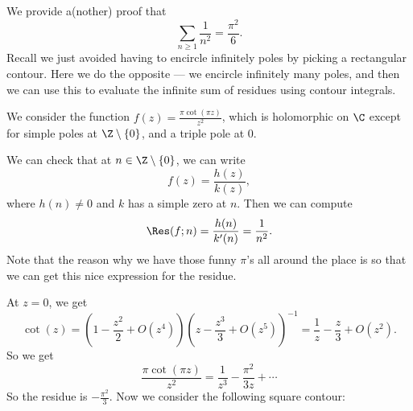 \documentclass[a4paper]{article}
\begin{document}
\begin{eg}
  We provide a(nother) proof that
  \[
    \sum_{n \geq 1} \frac{1}{n^2} = \frac{\pi^2}{6}.
  \]
  Recall we just avoided having to encircle infinitely poles by picking a rectangular contour. Here we do the opposite --- we encircle infinitely many poles, and then we can use this to evaluate the infinite sum of residues using contour integrals.

  We consider the function $f(z) = \frac{\pi \cot(\pi z)}{z^2}$, which is holomorphic on $\C$ except for simple poles at $\Z \setminus \{0\}$, and a triple pole at $0$.

  We can check that at $n \in \Z \setminus \{0\}$, we can write
  \[
    f(z) = \frac{h(z)}{k(z)},
  \]
  where $h(n) \not= 0$ and $k$ has a simple zero at $n$. Then we can compute
  \[
    \Res(f; n) = \frac{h(n)}{k'(n)} = \frac{1}{n^2}.
  \]
  Note that the reason why we have those funny $\pi$'s all around the place is so that we can get this nice expression for the residue.

  At $z = 0$, we get
  \[
    \cot(z) = \left(1 - \frac{z^2}{2} + O(z^4)\right) \left(z - \frac{z^3}{3} + O(z^5)\right)^{-1} = \frac{1}{z} - \frac{z}{3} + O(z^2).
  \]
  So we get
  \[
    \frac{\pi \cot (\pi z)}{z^2} = \frac{1}{z^3} - \frac{\pi^2}{3z} + \cdots
  \]
  So the residue is $-\frac{\pi^2}{3}$. Now we consider the following square contour:
  \begin{center}
\end{center}
\end{eg}
\end{document}

